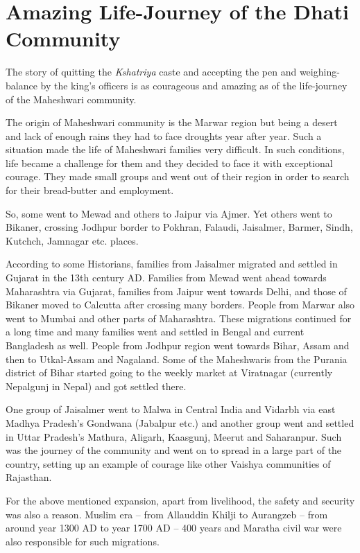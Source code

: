 \chapter{Amazing Life-Journey of the Dhati Community}
The story of quitting the \textit{Kshatriya} caste and accepting the pen and
weighing-balance by the king's officers is as courageous and amazing as of the
life-journey of the Maheshwari community.

The origin of Maheshwari community is the Marwar region but being a desert and
lack of enough rains they had to face droughts year after year. Such a
situation made the life of Maheshwari families very difficult. In such
conditions, life became a challenge for them and they decided to face it with
exceptional courage. They made small groups and went out of their region in
order to search for their bread-butter and employment.

So, some went to Mewad and others to Jaipur via Ajmer. Yet others went to
Bikaner, crossing Jodhpur border to Pokhran, Falaudi, Jaisalmer, Barmer, Sindh,
Kutchch, Jamnagar etc. places.

According to some Historians, families from Jaisalmer migrated and settled in
Gujarat in the 13th century AD. Families from Mewad went ahead towards
Maharashtra via Gujarat, families from Jaipur went towards Delhi, and those of
Bikaner moved to Calcutta after crossing many borders. People from Marwar also
went to Mumbai and other parts of Maharashtra. These migrations continued for a
long time and many families went and settled in Bengal and current Bangladesh
as well. People from Jodhpur region went towards Bihar, Assam and then to
Utkal-Assam and Nagaland. Some of the Maheshwaris from the Purania district of
Bihar started going to the weekly market at Viratnagar (currently Nepalgunj in
Nepal) and got settled there.

One group of Jaisalmer went to Malwa in Central India and Vidarbh via east
Madhya Pradesh's Gondwana (Jabalpur etc.) and another group went and settled in
Uttar Pradesh's Mathura, Aligarh, Kaasgunj, Meerut and Saharanpur. Such was the
journey of the community and went on to spread in a large part of the country,
setting up an example of courage like other Vaishya communities of
Rajasthan.

For the above mentioned expansion, apart from livelihood, the safety and
security was also a reason. Muslim era -- from Allauddin Khilji to Aurangzeb --
from around year 1300 AD to year 1700 AD -- 400 years and Maratha civil war
were also responsible for such migrations.

